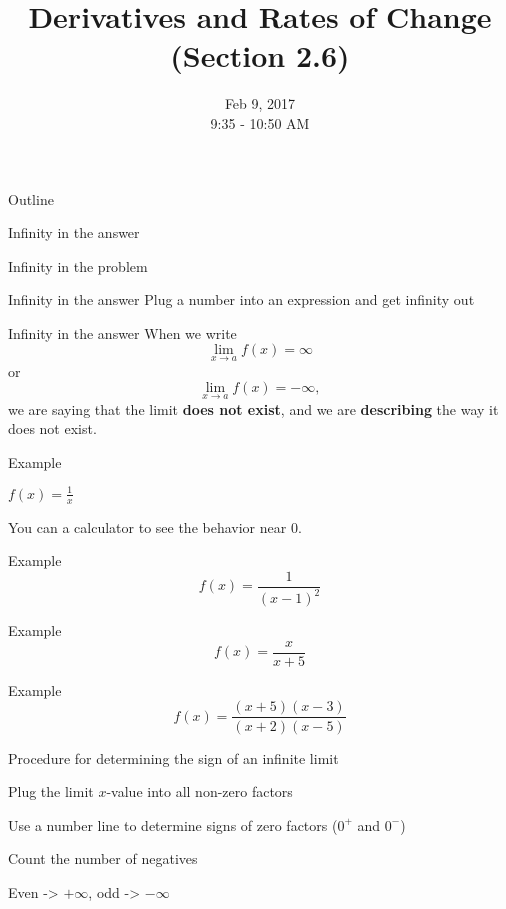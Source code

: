 \documentclass[t]{beamer}
\title{Derivatives and Rates of Change (Section 2.6)}
\date{Feb 9, 2017 \\ 9:35 - 10:50 AM}
\newenvironment{fpi}
  {\itemize[nolistsep,itemsep=\fill]}
  {\vfill\enditemize}
\begin{document}
\frame{\titlepage}

\begin{frame}{Outline}
\begin{fpi}
\item Infinity in the answer
\item Infinity in the problem
\end{fpi}
\end{frame}

\begin{frame}{Infinity in the answer}
Plug a number into an expression and get infinity out
\end{frame}

\begin{frame}{Infinity in the answer}
When we write 
$$ \lim_{x \to a} f(x) = \infty$$
or 
$$ \lim_{x \to a} f(x) = -\infty,$$
we are saying that the limit \textbf{does not exist}, and 
we are \textbf{describing} the way it does not exist.
\end{frame}

\begin{frame}{Example}
\begin{fpi}
\item $\displaystyle f(x) = \frac{1}{x}$
\item You can a calculator to see the behavior near 0.
\end{fpi}
\end{frame}

\begin{frame}{Example}
$$f(x) = \frac{1}{(x-1)^2}$$
\end{frame}

\begin{frame}{Example}
$$f(x) = \frac{x}{x+5}$$
\end{frame}


\begin{frame}{Example}
$$f(x) = \frac{(x+5)(x-3)}{(x+2)(x-5)}$$
\end{frame}

\begin{frame}{Procedure for determining the sign of an infinite limit}
\begin{fpi}
\item Plug the limit $x$-value into all non-zero factors
\item Use a number line to determine signs of zero factors ($0^+$ and $0^-$)
\item Count the number of negatives
\item Even -> $+\infty$,  odd -> $-\infty$
\end{fpi}
\end{frame}
\end{document}
